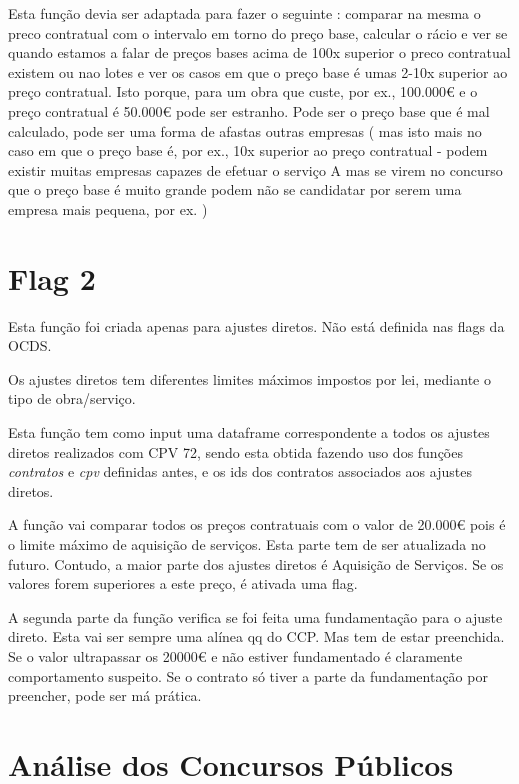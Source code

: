 Esta função devia ser adaptada para fazer o seguinte : comparar na mesma o preco contratual com o intervalo em torno do preço base, calcular o rácio e ver se quando estamos a falar de preços bases acima de 100x superior o preco contratual existem ou nao lotes e ver os casos em que o preço base é umas 2-10x superior ao preço contratual. Isto porque, para um obra que custe, por ex., 100.000€ e o preço contratual é 50.000€ pode ser estranho. Pode ser o preço base que é mal calculado, pode ser uma forma de afastas outras empresas ( mas isto mais no caso em que o preço base é, por ex., 10x superior ao preço contratual - podem existir muitas empresas capazes de efetuar o serviço A mas se virem no concurso que o preço base é muito grande podem não se candidatar por serem uma empresa mais pequena, por ex. )



\section{Flag 2}

Esta função foi criada apenas para ajustes diretos. Não está definida nas flags da OCDS. 

Os ajustes diretos tem diferentes limites máximos impostos por lei, mediante o tipo de obra/serviço. 

Esta função tem como input uma dataframe correspondente a todos os ajustes diretos realizados com CPV 72, sendo esta obtida fazendo uso dos funções \textit{contratos} e \textit{cpv} definidas antes, e os ids dos contratos associados aos ajustes diretos. 

A função vai comparar todos os preços contratuais com o valor de 20.000€ pois é o limite máximo de aquisição de serviços. Esta parte tem de  ser atualizada no futuro. Contudo, a maior parte dos ajustes diretos é Aquisição de Serviços. Se os valores forem superiores a este preço, é ativada uma flag.

A segunda parte da função verifica se foi feita uma fundamentação para o ajuste direto. Esta vai ser sempre uma alínea qq do CCP. Mas tem de estar preenchida. Se o valor ultrapassar os 20000€ e não estiver fundamentado é claramente comportamento suspeito. Se o contrato só tiver a parte da fundamentação por preencher, pode ser má prática. 


\section{Análise dos Concursos Públicos}

